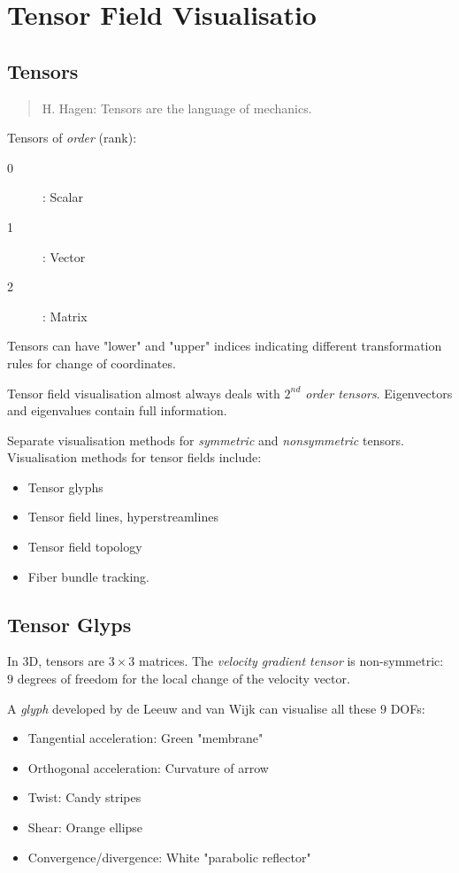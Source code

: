 \section{Tensor Field Visualisatio}
\subsection{Tensors}
\begin{quote}{H. Hagen:}
    Tensors are the language of mechanics.
\end{quote}
Tensors of \emph{order} (rank):
\begin{description}
\item[0]: Scalar
\item[1]: Vector
\item[2]: Matrix
\end{description}
Tensors can have "lower" and "upper" indices indicating different transformation rules for change of coordinates.

Tensor field visualisation almost always deals with \emph{$2^{nd}$ order tensors}. Eigenvectors and eigenvalues contain full information.

Separate visualisation methods for \emph{symmetric} and \emph{nonsymmetric} tensors. Visualisation methods for tensor fields include:
\begin{itemize}
    \item Tensor glyphs
    \item Tensor field lines, hyperstreamlines
    \item Tensor field topology
    \item Fiber bundle tracking.
\end{itemize}

\subsection{Tensor Glyps}
In 3D, tensors are $3\times 3$ matrices. The \emph{velocity gradient tensor} is non-symmetric:  $9$ degrees of freedom for the local change of the velocity vector. 

A \emph{glyph} developed by de Leeuw and van Wijk can visualise all these $9$ DOFs:
\begin{itemize}
    \item Tangential acceleration: Green "membrane"
    \item Orthogonal acceleration: Curvature of arrow
    \item Twist: Candy stripes
    \item Shear: Orange ellipse
    \item Convergence/divergence: White "parabolic reflector"
\end{itemize}

